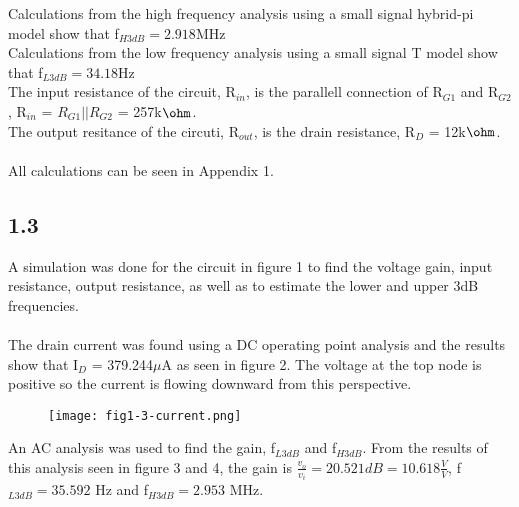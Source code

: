   Calculations from the high frequency analysis using a small signal hybrid-pi model show that f$_{H 3dB} = 2.918$MHz\\

  Calculations from the low frequency analysis using a small signal T model show that f$_{L 3dB} = 34.18$Hz\\

  The input resistance of the circuit, R$_{in}$, is the parallell connection of R$_{G1}$ and R$_{G2}$, R$_{in}$ = $R_{G1}||R_{G2}$ = 257k$\ohm$.\\
  The output resitance of the circuti, R$_{out}$, is the drain resistance, R$_D$ = 12k$\ohm$.\\\\

  All calculations can be seen in Appendix 1.

\subsection*{1.3}

  A simulation was done for the circuit in figure 1 to find the voltage gain, input resistance, output resistance, as well as to estimate the lower and upper 3dB frequencies.\\\\

  The drain current was found using a DC operating point analysis and the results show that I$_D$ = 379.244$\mu$A as seen in figure 2. The voltage at the top node is positive so the current is flowing downward from this perspective.\\

  \begin{figure}[h!]
        \centering
        \texttt{[image: fig1-3-current.png]}
  \end{figure}

  An AC analysis was used to find the gain, f$_{L 3dB}$ and f$_{H 3dB}$. From the results of this analysis seen in figure 3 and 4, the gain is $\frac{v_o}{v_i} = 20.521 dB = 10.618 \frac{V}{V}$, f$_{L 3dB} = 35.592$ Hz and f$_{H 3dB} = 2.953$ MHz.\\


